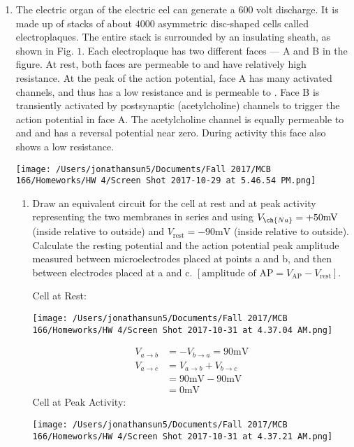 \documentclass[11pt]{article}
\begin{document}
\begin{enumerate}[label=\arabic*.]
\newpage
\item
The electric organ of the electric eel can generate a $600$ volt discharge. It is made up of stacks of about $4000$ asymmetric disc-shaped cells called electroplaques. The entire stack is surrounded by an insulating sheath, as shown in Fig. $1$. Each electroplaque has two different faces --- A and B in the figure. At rest, both faces are permeable to  and have relatively high resistance. At the peak of the action potential, face A has many activated  channels, and thus has a low resistance and is permeable to . Face B is transiently activated by postsynaptic (acetylcholine) channels to trigger the action potential in face A. The acetylcholine channel is equally permeable to  and  and has a reversal potential near zero. During activity this face also shows a low resistance.
\begin{center}
\texttt{[image: /Users/jonathansun5/Documents/Fall 2017/MCB 166/Homeworks/HW 4/Screen Shot 2017-10-29 at 5.46.54 PM.png]}
\end{center}
\begin{enumerate}[label=(\alph*)]
\item
Draw an equivalent circuit for the cell at rest and at peak activity representing the two membranes in series and using $V_{\ch{Na}} = +50 \text{mV}$ (inside relative to outside) and $V_{\text{rest}} = -90 \text{mV}$ (inside relative to outside). Calculate the resting potential and the action potential peak amplitude measured between microelectrodes placed at points a and b, and then between electrodes placed at a and c. $[\text{amplitude of AP} = V_{\text{AP}} - V_{\text{rest}}]$.
\begin{multicols}{2}
Cell at Rest:
\begin{center}
\texttt{[image: /Users/jonathansun5/Documents/Fall 2017/MCB 166/Homeworks/HW 4/Screen Shot 2017-10-31 at 4.37.04 AM.png]}
\end{center}
\begin{align*}
V_{a \to b} &= -V_{b \to a} = 90 \text{mV} \\
V_{a \to c} &= V_{a \to b} + V_{b \to c} \\
&= 90 \text{mV} -90 \text{mV} \\
&= 0 \text{mV}
\end{align*}
\medbreak
Cell at Peak Activity:
\begin{center}
\texttt{[image: /Users/jonathansun5/Documents/Fall 2017/MCB 166/Homeworks/HW 4/Screen Shot 2017-10-31 at 4.37.21 AM.png]}

\end{center}
\end{multicols}
\end{enumerate}
\end{enumerate}
\end{document}
